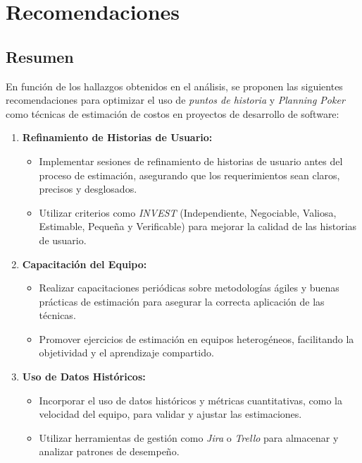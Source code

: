 \chapter{Recomendaciones}

\section{Resumen}
En función de los hallazgos obtenidos en el análisis, se proponen las siguientes recomendaciones para optimizar el uso de \textit{puntos de historia} y \textit{Planning Poker} como técnicas de estimación de costos en proyectos de desarrollo de software:

\begin{enumerate}
    \item \textbf{Refinamiento de Historias de Usuario:}
    \begin{itemize}
        \item Implementar sesiones de refinamiento de historias de usuario antes del proceso de estimación, asegurando que los requerimientos sean claros, precisos y desglosados.
        \item Utilizar criterios como \textit{INVEST} (Independiente, Negociable, Valiosa, Estimable, Pequeña y Verificable) para mejorar la calidad de las historias de usuario.
    \end{itemize}

    \item \textbf{Capacitación del Equipo:}
    \begin{itemize}
        \item Realizar capacitaciones periódicas sobre metodologías ágiles y buenas prácticas de estimación para asegurar la correcta aplicación de las técnicas.
        \item Promover ejercicios de estimación en equipos heterogéneos, facilitando la objetividad y el aprendizaje compartido.
    \end{itemize}

    \item \textbf{Uso de Datos Históricos:}
    \begin{itemize}
        \item Incorporar el uso de datos históricos y métricas cuantitativas, como la velocidad del equipo, para validar y ajustar las estimaciones.
        \item Utilizar herramientas de gestión como \textit{Jira} o \textit{Trello} para almacenar y analizar patrones de desempeño.
    \end{itemize}


\end{enumerate}
